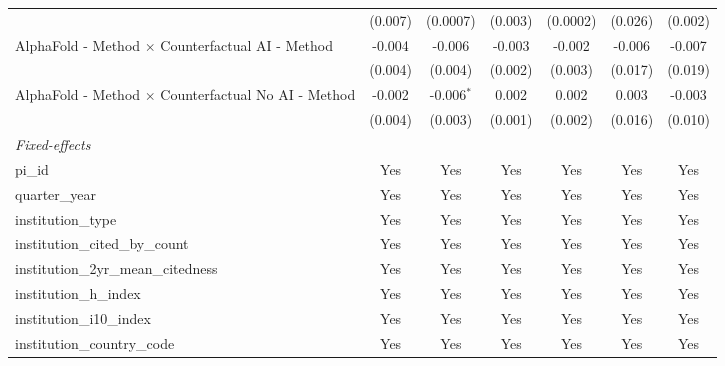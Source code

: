 \begin{tabular}{lcccccc}
                                                               & (0.007)        & (0.0007)      & (0.003)       & (0.0002)      & (0.026)       & (0.002)\\   
   AlphaFold - Method $\times$ Counterfactual AI - Method      & -0.004         & -0.006        & -0.003        & -0.002        & -0.006        & -0.007\\   
                                                               & (0.004)        & (0.004)       & (0.002)       & (0.003)       & (0.017)       & (0.019)\\   
   AlphaFold - Method $\times$ Counterfactual No AI - Method   & -0.002         & -0.006$^{*}$  & 0.002         & 0.002         & 0.003         & -0.003\\   
                                                               & (0.004)        & (0.003)       & (0.001)       & (0.002)       & (0.016)       & (0.010)\\   
   \midrule
   \emph{Fixed-effects}\\
   pi\_id                                                      & Yes            & Yes           & Yes           & Yes           & Yes           & Yes\\  
   quarter\_year                                               & Yes            & Yes           & Yes           & Yes           & Yes           & Yes\\  
   institution\_type                                           & Yes            & Yes           & Yes           & Yes           & Yes           & Yes\\  
   institution\_cited\_by\_count                               & Yes            & Yes           & Yes           & Yes           & Yes           & Yes\\  
   institution\_2yr\_mean\_citedness                           & Yes            & Yes           & Yes           & Yes           & Yes           & Yes\\  
   institution\_h\_index                                       & Yes            & Yes           & Yes           & Yes           & Yes           & Yes\\  
   institution\_i10\_index                                     & Yes            & Yes           & Yes           & Yes           & Yes           & Yes\\  
   institution\_country\_code                                  & Yes            & Yes           & Yes           & Yes           & Yes           & Yes\\  

\end{tabular}
